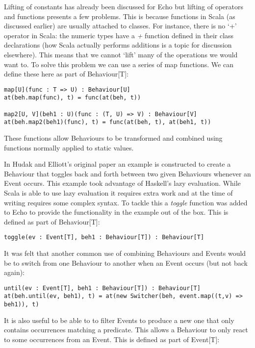     Lifting of constants has already been discussed for Echo but lifting of operators and
    functions presents a few problems. This is because functions in Scala (as discussed earlier)
    are usually attached to classes. For instance, there is no `+' operator in Scala: the numeric
    types have a \emph{+} function defined in their class declarations (how Scala actually performs additions
    is a topic for discussion elsewhere). This means that we cannot `lift' many of the operations we
    would want to. To solve this problem we can use a series of map functions. We can define these
    here as part of Behaviour[T]:

\begin{verbatim}
map[U](func : T => U) : Behaviour[U]
at(beh.map(func), t) = func(at(beh, t))

map2[U, V](beh1 : U)(func : (T, U) => V) : Behaviour[V]
at(beh.map2(beh1)(func), t) = func(at(beh, t), at(beh1, t))
\end{verbatim}        

    These functions allow Behaviours to be transformed and combined using functions
    normally applied to static values.
    
    In Hudak and Elliott's original paper an example is constructed to create a Behaviour
    that toggles back and forth between two given Behaviours whenever an Event occurs. This
    example took advantage of Haskell's lazy evaluation. While Scala is able to use lazy evaluation
    it requires extra work and at the time of writing requires some complex syntax. To tackle this
    a \emph{toggle} function was added to Echo to provide the functionality in the example out of the box.
    This is defined as part of Behaviour[T]:
    
\begin{verbatim}
toggle(ev : Event[T], beh1 : Behaviour[T]) : Behaviour[T]
\end{verbatim}        
    
    It was felt that another common use of combining Behaviours and Events would be
    to switch from one Behaviour to another when an Event occurs (but not back again):

\begin{verbatim}
until(ev : Event[T], beh1 : Behaviour[T]) : Behaviour[T]
at(beh.until(ev, beh1), t) = at(new Switcher(beh, event.map((t,v) => beh1)), t)
\end{verbatim}        
    
    It is also useful to be able to to filter Events to produce a new one that only
    contains occurrences matching a predicate. This allows a Behaviour to only react
    to some occurrences from an Event. This is defined as part of Event[T]:

